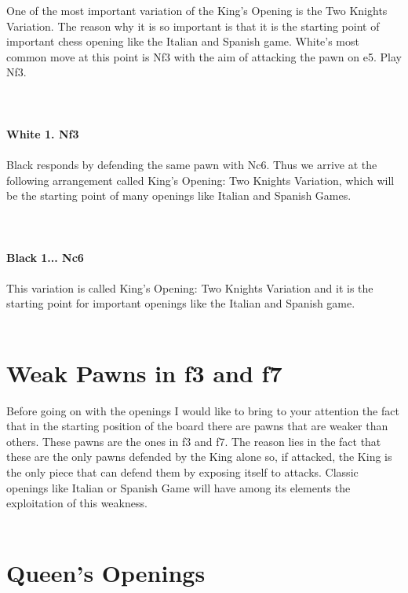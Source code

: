 \documentclass{article}
\begin{document}
One of the most important variation of the King's Opening is the Two Knights Variation. The reason why it is so important is that it is the starting point of important chess opening like the Italian and Spanish game. White's most common move at this point is Nf3 with the aim of attacking the pawn on e5. Play Nf3.\\
\\

\\
\\
\textbf{White 1. Nf3}\\
\\
Black responds by defending the same pawn with Nc6. Thus we arrive at the following arrangement called King's Opening: Two Knights Variation, which will be the starting point of many openings like Italian and Spanish Games.\\
\\

\\
\\
\textbf{Black 1... Nc6}\\
\\
This variation is called King's Opening: Two Knights Variation and it is the starting point for important openings like the Italian and Spanish game.\\
\\
\section{ Weak Pawns in f3 and f7}

Before going on with the openings I would like to bring to your attention the fact that in the starting position of the board there are pawns that are weaker than others. These pawns are the ones in f3 and f7. The reason lies in the fact that these are the only pawns defended by the King alone so, if attacked, the King is the only piece that can defend them by exposing itself to attacks. Classic openings like Italian or Spanish Game will have among its elements the exploitation of this weakness.\\
\\
\section{ Queen's Openings}
\end{document}
